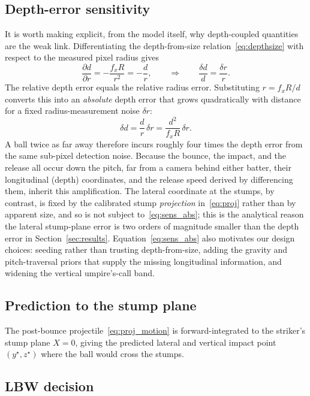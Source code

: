\documentclass[journal]{IEEEtran}
\begin{document}
\subsection{Depth-error sensitivity}
\label{sec:sensitivity}
It is worth making explicit, from the model itself, why depth-coupled quantities
are the weak link. Differentiating the depth-from-size
relation~\eqref{eq:depthsize} with respect to the measured pixel radius gives
\begin{equation}
\frac{\partial d}{\partial r}=-\frac{f_x R}{r^2}=-\frac{d}{r},
\qquad\Rightarrow\qquad
\frac{\delta d}{d}=\frac{\delta r}{r}.
\label{eq:sens_rel}
\end{equation}
The relative depth error equals the relative radius error. Substituting
$r=f_xR/d$ converts this into an \emph{absolute} depth error that grows
quadratically with distance for a fixed radius-measurement noise $\delta r$:
\begin{equation}
\delta d=\frac{d}{r}\,\delta r=\frac{d^2}{f_x R}\,\delta r.
\label{eq:sens_abs}
\end{equation}
A ball twice as far away therefore incurs roughly four times the depth error
from the same sub-pixel detection noise. Because the bounce, the impact, and
the release all occur down the pitch, far from a camera behind either
batter, their longitudinal (depth) coordinates, and the release speed derived
by differencing them, inherit this amplification. The lateral coordinate at the
stumps, by contrast, is fixed by the calibrated stump \emph{projection}
in~\eqref{eq:proj} rather than by apparent size, and so is not subject
to~\eqref{eq:sens_abs}; this is the analytical reason the lateral stump-plane
error is two orders of magnitude smaller than the depth error in
Section~\ref{sec:results}. Equation~\eqref{eq:sens_abs} also motivates our design
choices: seeding rather than trusting depth-from-size, adding the gravity and
pitch-traversal priors that supply the missing longitudinal information, and
widening the vertical umpire's-call band.

\subsection{Prediction to the stump plane}
The post-bounce projectile~\eqref{eq:proj_motion} is forward-integrated to the
striker's stump plane $X=0$, giving the predicted lateral and vertical impact
point $(y^\star,z^\star)$ where the ball would cross the stumps.

\subsection{LBW decision}
\label{sec:lbw}
\end{document}
